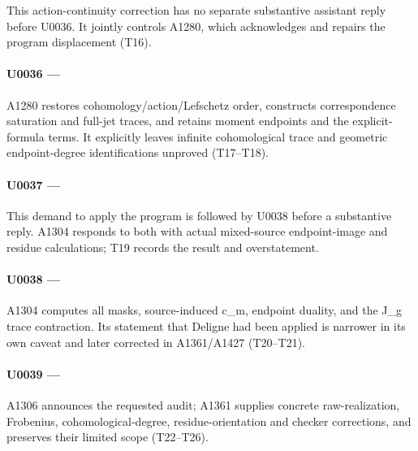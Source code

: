 This action-continuity correction has no separate substantive assistant
reply before U0036. It jointly controls A1280, which acknowledges and
repairs the program displacement (T16).

\paragraph{\texorpdfstring{U0036 ---
\protect{}}{U0036 --- }}\label{u0036-d6542f7d-b917-4de5-b35d-07062f16e9c1}

A1280 restores cohomology/action/Lefschetz order, constructs
correspondence saturation and full-jet traces, and retains moment
endpoints and the explicit-formula terms. It explicitly leaves infinite
cohomological trace and geometric endpoint-degree identifications
unproved (T17--T18).

\paragraph{\texorpdfstring{U0037 ---
\protect{}}{U0037 --- }}\label{u0037-8b2110e7-195b-42d0-8c86-7277004e35fd}

This demand to apply the program is followed by U0038 before a
substantive reply. A1304 responds to both with actual mixed-source
endpoint-image and residue calculations; T19 records the result and
overstatement.

\paragraph{\texorpdfstring{U0038 ---
\protect{}}{U0038 --- }}\label{u0038-4ab2ff8f-915a-417d-876f-7294ed662b24}

A1304 computes all masks, source-induced c\_m, endpoint duality, and the
J\_g trace contraction. Its statement that Deligne had been applied is
narrower in its own caveat and later corrected in A1361/A1427
(T20--T21).

\paragraph{\texorpdfstring{U0039 ---
\protect{}}{U0039 --- }}\label{u0039-71c1d5ee-668e-4eea-ac21-d844702248ea}

A1306 announces the requested audit; A1361 supplies concrete
raw-realization, Frobenius, cohomological-degree, residue-orientation
and checker corrections, and preserves their limited scope (T22--T26).

